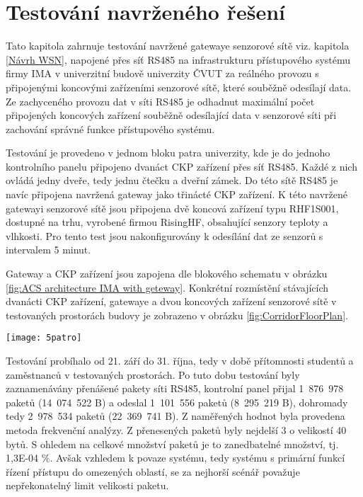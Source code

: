 \chapter{Testování navrženého řešení}
Tato kapitola zahrnuje testování navržené gatewaye senzorové sítě viz. kapitola \ref{Návrh WSN}, napojené přes síť RS485 na infrastrukturu přístupového systému firmy IMA v univerzitní budově univerzity ČVUT za reálného provozu s připojenými koncovými zařízeními senzorové sítě, které souběžně odesílají data. Ze zachyceného provozu dat v síti RS485 je odhadnut maximální počet připojených koncových zařízení souběžně odesílající data v senzorové síti při zachování správné funkce přístupového systému.

Testování je provedeno v jednom bloku patra univerzity, kde je do jednoho kontrolního panelu připojeno dvanáct CKP zařízení přes síť RS485. Každé z nich ovládá jedny dveře, tedy jednu čtečku a dveřní zámek.
Do této sítě RS485 je navíc připojena navržená gateway jako třinácté CKP zařízení.
K této navržené gatewayi senzorové sítě jsou připojena dvě koncová zařízení typu RHF1S001, dostupné na trhu, vyrobené firmou RisingHF, obsahující senzory teploty a vlhkosti. Pro tento test jsou nakonfigurovány k odesílání dat ze senzorů s intervalem 5 minut.

Gateway a CKP zařízení jsou zapojena dle blokového schematu v obrázku \ref{fig:ACS architecture IMA with geteway}.
Konkrétní rozmístění stávajících dvanácti CKP zařízení, gatewaye a dvou koncových zařízení senzorové sítě v testovaných prostorách budovy je zobrazeno v obrázku \ref{fig:CorridorFloorPlan}.

\begin{figure*}[!ht]
    \centering
    \texttt{[image: 5patro]}
    \caption{Rozmístění koncových zařízení sítě a zařízení CKP v testovaných prostorách budovy}
    \label{fig:CorridorFloorPlan}
\end{figure*}

Testování probíhalo od 21. září do 31. října, tedy v době přítomnosti studentů a zaměstnanců v testovaných prostorách. 
Po tuto dobu testování byly zaznamenávány přenášené pakety síti RS485, kontrolní panel přijal 1~876~978 paketů (14~074~522 B) a odeslal 1~101~556 paketů (8~295~219 B), dohromady tedy 2~978~534 paketů (22~369~741 B).
Z naměřených hodnot byla provedena metoda frekvenční analýzy. Z přenesených paketů byly nejdelší 3 o velikostí 40 bytů.
S ohledem na celkové množství paketů je to zanedbatelné množství, tj. 1,3E-04 \%.
Avšak vzhledem k povaze systému, tedy systému s primární funkcí řízení přístupu do omezených oblastí, se za nejhorší scénář považuje nepřekonatelný limit velikosti paketu.

